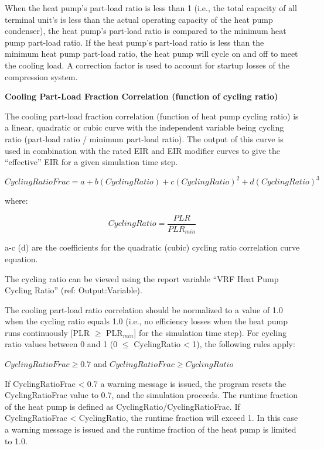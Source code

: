 When the heat pump's part-load ratio is less than 1 (i.e., the total capacity of all terminal unit's is less than the actual operating capacity of the heat pump condenser), the heat pump's part-load ratio is compared to the minimum heat pump part-load ratio. If the heat pump's part-load ratio is less than the minimum heat pump part-load ratio, the heat pump will cycle on and off to meet the cooling load. A correction factor is used to account for startup losses of the compression system.

\textbf{Cooling Part-Load Fraction Correlation (function of cycling ratio)}

The cooling part-load fraction correlation (function of heat pump cycling ratio) is a linear, quadratic or cubic curve with the independent variable being cycling ratio (part-load ratio / minimum part-load ratio). The output of this curve is used in combination with the rated EIR and EIR modifier curves to give the ``effective'' EIR for a given simulation time step.

\begin{equation}
  CyclingRatioFrac = a + b \left( CyclingRatio \right) + c \left( CyclingRatio \right)^2 + d \left( CyclingRatio \right)^3
\end{equation}

where:

\begin{equation}
  CyclingRatio = \frac{PLR}{PLR_{min}}
\end{equation}

a-c (d) are the coefficients for the quadratic (cubic) cycling ratio correlation curve equation.

The cycling ratio can be viewed using the report variable ``VRF Heat Pump Cycling Ratio'' (ref: Output:Variable).

The cooling part-load ratio correlation should be normalized to a value of 1.0 when the cycling ratio equals 1.0 (i.e., no efficiency losses when the heat pump runs continuously [PLR \(\geq\) PLR\(_{min}\)] for the simulation time step). For cycling ratio values between 0 and 1 (0 \(\leq\) CyclingRatio < 1), the following rules apply:

\(CyclingRatioFrac \geq 0.7\) and \(CyclingRatioFrac \geq CyclingRatio\)

If CyclingRatioFrac < 0.7 a warning message is issued, the program resets the CyclingRatioFrac value to 0.7, and the simulation proceeds. The runtime fraction of the heat pump is defined as CyclingRatio/CyclingRatioFrac. If CyclingRatioFrac < CyclingRatio, the runtime fraction will exceed 1. In this case a warning message is issued and the runtime fraction of the heat pump is limited to 1.0.

